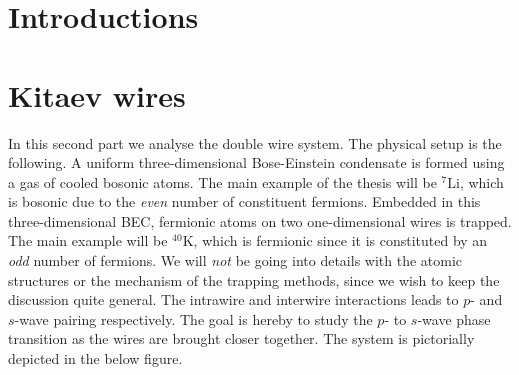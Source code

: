 \documentclass[11pt, twoside]{Thesis}
\begin{document}




\tableofcontents %




\mainmatter %

\pagestyle{fancy} %



\part{Introductions}
\newpage


 

\part{Kitaev wires}
In this second part we analyse the double wire system. The physical setup is the following. A uniform three-dimensional Bose-Einstein condensate is formed using a gas of cooled bosonic atoms. The main example of the thesis will be $^{7}\text{Li}$, which is bosonic due to the \textit{even} number of constituent fermions. Embedded in this three-dimensional BEC, fermionic atoms on two one-dimensional wires is trapped. The main example will be $^{40}\text{K}$, which is fermionic since it is constituted by an \textit{odd} number of fermions. We will \textit{not} be going into details with the atomic structures or the mechanism of the trapping methods, since we wish to keep the discussion quite general. The intrawire and interwire interactions leads to $p$- and $s$-wave pairing respectively. The goal is hereby to study the $p$- to $s$-wave phase transition as the wires are brought closer together. The system is pictorially depicted in the below figure.
\end{document}
